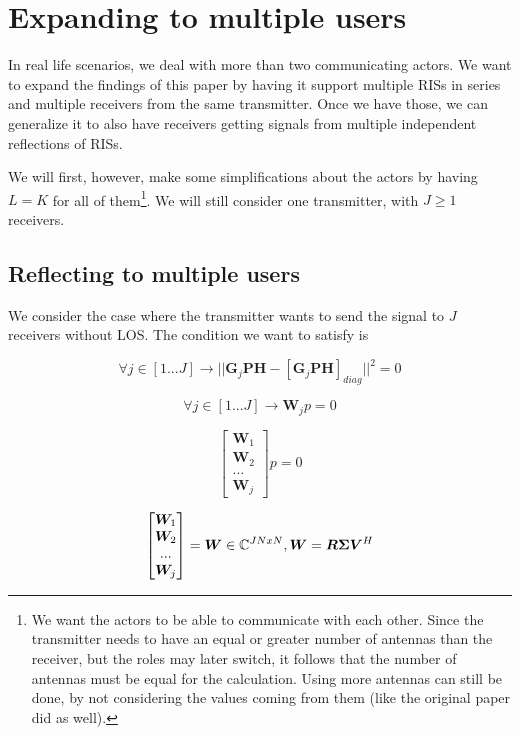 \section{Expanding to multiple users}

In real life scenarios, we deal with more than two communicating actors. We want to expand the findings of this paper by having it support multiple RISs in series and multiple receivers from the same transmitter. Once we have those, we can generalize it to also have receivers getting signals from multiple independent reflections of RISs.

We will first, however, make some simplifications about the actors by having $L = K$ for all of them\footnote{We want the actors to be able to communicate with each other. Since the transmitter needs to have an equal or greater number of antennas than the receiver, but the roles may later switch, it follows that the number of antennas must be equal for the calculation. Using more antennas can still be done, by not considering the values coming from them (like the original paper did as well).}. We will still consider one transmitter, with $J \ge 1$ receivers.

\subsection{Reflecting to multiple users}

We consider the case where the transmitter wants to send the signal to $J$ receivers without LOS. The condition we want to satisfy is

\begin{equation}
  \forall j \in [1...J] \rightarrow || \bm{G}_j\bm{PH} - [\bm{G}_j\bm{PH}]_{diag} || ^2 = 0
\end{equation}

\begin{equation}
  \forall j \in [1...J] \rightarrow \bm{W}_jp = 0
\end{equation}

\begin{equation}
  \begin{bmatrix}
    \bm{W}_1  \\
    \bm{W}_ 2 \\
    ...       \\
    \bm{W}_j
  \end{bmatrix}
  p = 0
\end{equation}

\begin{equation}
  \begin{bmatrix}
    \bm{W}_1  \\
    \bm{W}_ 2 \\
    ...       \\
    \bm{W}_j
  \end{bmatrix}
  = \bm{W} \in \mathbb{C} ^ {JNxN}, \bm{W} = \bm{R \Sigma V}^H
\end{equation}

